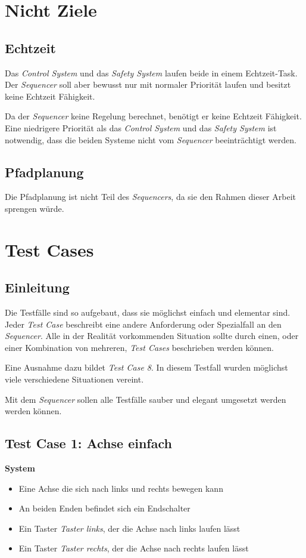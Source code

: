 \section{Nicht Ziele}
\subsection{Echtzeit}
Das \textit{Control System} und das \textit{Safety System} laufen beide in einem Echtzeit-Task.
Der \textit{Sequencer} soll aber bewusst nur mit normaler Priorität laufen und besitzt keine Echtzeit Fähigkeit.

Da der \textit{Sequencer} keine Regelung berechnet, benötigt er keine Echtzeit Fähigkeit.
Eine niedrigere Priorität als das \textit{Control System} und das \textit{Safety System} ist notwendig, dass die beiden Systeme nicht vom \textit{Sequencer} beeinträchtigt werden.


\subsection{Pfadplanung}
Die Pfadplanung ist nicht Teil des \textit{Sequencers}, da sie den Rahmen dieser Arbeit sprengen würde.



\section{Test Cases}
\subsection{Einleitung}
Die Testfälle sind so aufgebaut, dass sie möglichst einfach und elementar sind.
Jeder \textit{Test Case} beschreibt eine andere Anforderung oder Spezialfall an den \textit{Sequencer}.
Alle in der Realität vorkommenden Situation sollte durch einen, oder einer Kombination von mehreren, \textit{Test Cases} beschrieben werden können.

Eine Ausnahme dazu bildet \textit{Test Case 8}.
In diesem Testfall wurden möglichst viele verschiedene Situationen vereint.

Mit dem \textit{Sequencer} sollen alle Testfälle sauber und elegant umgesetzt werden werden können.


\subsection{Test Case 1: Achse einfach}
\textbf{System}
\begin{itemize}
\item Eine Achse die sich nach links und rechts bewegen kann
\item An beiden Enden befindet sich ein Endschalter
\item Ein Taster \textit{Taster links}, der die Achse nach links laufen lässt
\item Ein Taster \textit{Taster rechts}, der die Achse nach rechts laufen lässt
\end{itemize}

